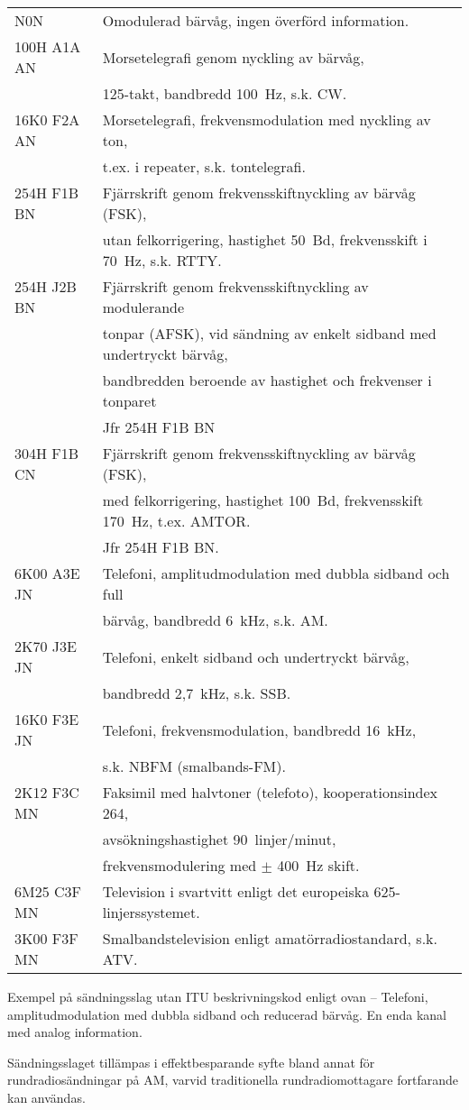 \begin{tabular}{ll}
	N0N & Omodulerad bärvåg, ingen överförd information.\\
	100H A1A AN & Morsetelegrafi genom nyckling av bärvåg,\\
	& 125-takt, bandbredd 100~Hz, s.k. CW.\\
	16K0 F2A AN & Morsetelegrafi, frekvensmodulation med nyckling av ton,\\
	& t.ex. i repeater, s.k. tontelegrafi.\\
	254H F1B BN & Fjärrskrift genom frekvensskiftnyckling av bärvåg (FSK),\\
	& utan felkorrigering, hastighet 50~Bd, frekvensskift i 70~Hz, s.k. RTTY.\\
	254H J2B BN & Fjärrskrift genom frekvensskiftnyckling av modulerande\\
	& tonpar (AFSK), vid sändning av enkelt sidband med undertryckt bärvåg,\\
	& bandbredden beroende av hastighet och frekvenser i tonparet\\
	& Jfr 254H F1B BN\\
	304H F1B CN & Fjärrskrift genom frekvensskiftnyckling av bärvåg (FSK),\\
	& med felkorrigering, hastighet 100~Bd, frekvensskift 170~Hz, t.ex. AMTOR.\\
	& Jfr 254H F1B BN.\\
	6K00 A3E JN & Telefoni, amplitudmodulation med dubbla sidband och full\\
	& bärvåg, bandbredd 6~kHz, s.k. AM.\\
	2K70 J3E JN & Telefoni, enkelt sidband och undertryckt bärvåg,\\
	& bandbredd 2,7~kHz, s.k. SSB.\\
	16K0 F3E JN & Telefoni, frekvensmodulation, bandbredd 16~kHz,\\
	& s.k. NBFM (smalbands-FM).\\
	2K12 F3C MN & Faksimil med halvtoner (telefoto), kooperationsindex 264,\\
	& avsökningshastighet 90~linjer/minut,\\
	& frekvensmodulering med \(\pm\) 400~Hz skift.\\
	6M25 C3F MN & Television i svartvitt enligt det europeiska 625-linjerssystemet.\\
	3K00 F3F MN & Smalbandstelevision enligt amatörradiostandard, s.k. ATV.\\
\end{tabular}

Exempel på sändningsslag utan ITU beskrivningskod enligt ovan
-- Telefoni, amplitudmodulation med dubbla sidband och reducerad bärvåg.
En enda kanal med analog information.

Sändningsslaget tillämpas i effektbesparande syfte bland annat för
rundradiosändningar på AM, varvid traditionella rundradiomottagare fortfarande
kan användas.

\twocolumn

